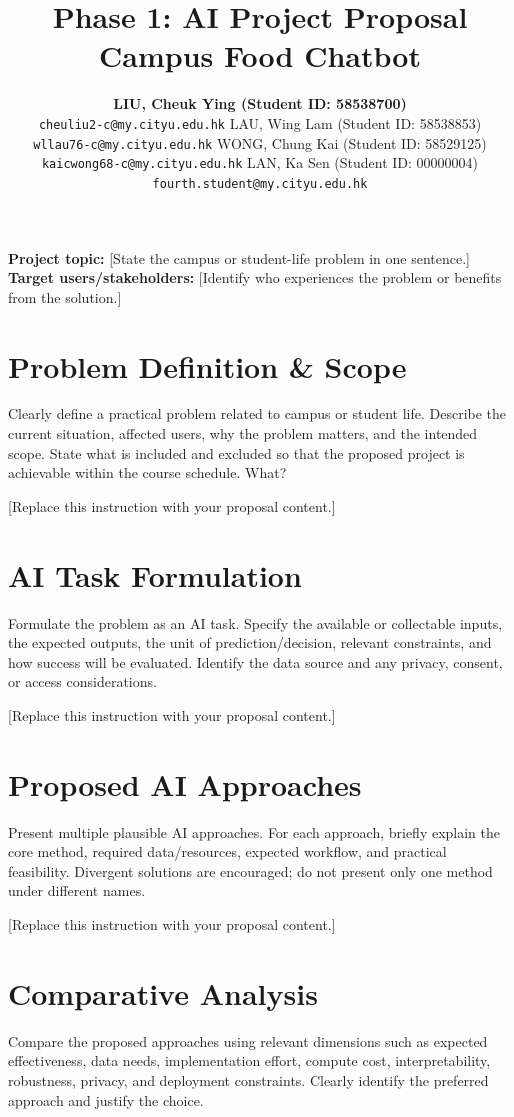 \documentclass{article}
\title{Phase 1: AI Project Proposal\\
\large Campus Food Chatbot}
\author{
  \textbf{LIU, Cheuk Ying (Student ID: 58538700)}\\
  \texttt{cheuliu2-c@my.cityu.edu.hk}
  \And
  LAU, Wing Lam (Student ID: 58538853)\\
  \texttt{wllau76-c@my.cityu.edu.hk}
  \AND
  WONG, Chung Kai (Student ID: 58529125)\\
  \texttt{kaicwong68-c@my.cityu.edu.hk}
  \And
  LAN, Ka Sen (Student ID: 00000004)\\
  \texttt{fourth.student@my.cityu.edu.hk}
}
\begin{document}
\maketitle

\noindent\textbf{Project topic:} [State the campus or student-life problem in one sentence.]\\
\textbf{Target users/stakeholders:} [Identify who experiences the problem or benefits from the solution.]


\section{Problem Definition \& Scope}
Clearly define a practical problem related to campus or student life. Describe the current situation, affected users, why the problem matters, and the intended scope. State what is included and excluded so that the proposed project is achievable within the course schedule.
What?

[Replace this instruction with your proposal content.]

\section{AI Task Formulation}
Formulate the problem as an AI task. Specify the available or collectable inputs, the expected outputs, the unit of prediction/decision, relevant constraints, and how success will be evaluated. Identify the data source and any privacy, consent, or access considerations.

[Replace this instruction with your proposal content.]

\section{Proposed AI Approaches}
Present multiple plausible AI approaches. For each approach, briefly explain the core method, required data/resources, expected workflow, and practical feasibility. Divergent solutions are encouraged; do not present only one method under different names.

[Replace this instruction with your proposal content.]

\section{Comparative Analysis}
Compare the proposed approaches using relevant dimensions such as expected effectiveness, data needs, implementation effort, compute cost, interpretability, robustness, privacy, and deployment constraints. Clearly identify the preferred approach and justify the choice.
\end{document}
